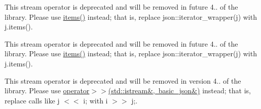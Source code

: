 
\begin{DoxyRefList}
\item[Member \mbox{\hyperlink{classnlohmann_1_1basic__json_a5e4212986136ca1220f351c60e89906b}{nlohmann::basic\+\_\+json$<$ Object\+Type, Array\+Type, String\+Type, Boolean\+Type, Number\+Integer\+Type, Number\+Unsigned\+Type, Number\+Float\+Type, Allocator\+Type, J\+S\+O\+N\+Serializer $>$::iterator\+\_\+wrapper}} (reference ref) noexcept]\label{deprecated__deprecated000001}%
%
This stream operator is deprecated and will be removed in future 4.. of the library. Please use \mbox{\hyperlink{classnlohmann_1_1basic__json_afe3e137ace692efa08590d8df40f58dd}{items()}} instead; that is, replace {\ttfamily json\+::iterator\+\_\+wrapper(j)} with {\ttfamily j.\+items()}. 

\label{deprecated__deprecated000004}%
%
This stream operator is deprecated and will be removed in future 4.. of the library. Please use \mbox{\hyperlink{classnlohmann_1_1basic__json_afe3e137ace692efa08590d8df40f58dd}{items()}} instead; that is, replace {\ttfamily json\+::iterator\+\_\+wrapper(j)} with {\ttfamily j.\+items()}.  
\item[Member \mbox{\hyperlink{classnlohmann_1_1basic__json_a60ca396028b8d9714c6e10efbf475af6}{nlohmann::basic\+\_\+json$<$ Object\+Type, Array\+Type, String\+Type, Boolean\+Type, Number\+Integer\+Type, Number\+Unsigned\+Type, Number\+Float\+Type, Allocator\+Type, J\+S\+O\+N\+Serializer $>$::operator$<$$<$}} (\mbox{\hyperlink{classnlohmann_1_1basic__json}{basic\+\_\+json}} \&j, std\+::istream \&i)]\label{deprecated__deprecated000003}%
%
This stream operator is deprecated and will be removed in version 4.. of the library. Please use \mbox{\hyperlink{classnlohmann_1_1basic__json_aaf363408931d76472ded14017e59c9e8}{operator$>$$>$(std\+::istream\&, basic\+\_\+json\&)}} instead; that is, replace calls like {\ttfamily j $<$$<$ i;} with {\ttfamily i $>$$>$ j;}. 


\end{DoxyRefList}
